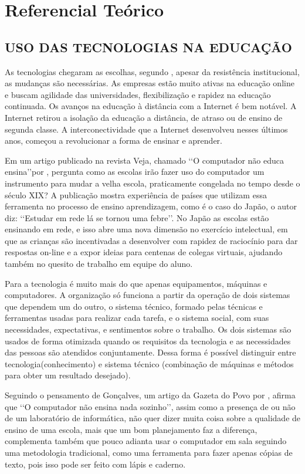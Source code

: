 \chapter[REFERENCIAL TEÓRICO]{Referencial Teórico}

\section{USO DAS TECNOLOGIAS NA EDUCAÇÃO}

As tecnologias chegaram as escolhas, segundo , apesar da resistência institucional, as mudanças são necessárias. As empresas estão muito ativas na educação online e buscam agilidade das universidades, flexibilização e rapidez na educação continuada. Os avanços na educação à distância com a Internet é bem notável. A Internet retirou a isolação da educação a distância, de atraso ou de ensino de segunda classe. A interconectividade que a Internet desenvolveu nesses últimos anos, começou a revolucionar a forma de ensinar e aprender.
\par
Em um artigo publicado na revista Veja, chamado \lq\lq O computador não educa ensina\rq\rq por , pergunta como as escolas irão fazer uso do computador um instrumento para mudar a velha escola, praticamente congelada no tempo desde o século XIX? A publicação mostra experiência de países que utilizam essa ferramenta no processo de ensino aprendizagem, como é o caso do Japão, o autor diz: \lq\lq Estudar em rede lá se tornou uma febre\rq\rq. No Japão as escolas estão ensinando em rede, e isso abre uma nova dimensão no exercício intelectual, em que as crianças são incentivadas a desenvolver com rapidez de raciocínio para dar respostas on-line e a expor ideias para centenas de colegas virtuais, ajudando também no quesito de trabalho em equipe do aluno.
\par
Para   a tecnologia é muito mais do que apenas equipamentos, máquinas e computadores. A organização só funciona a partir da operação de dois sistemas que dependem um do outro, o sistema técnico, formado pelas técnicas e ferramentas usadas para realizar cada tarefa, e o sistema social, com suas necessidades, expectativas, e sentimentos sobre o trabalho. Os dois sistemas são usados de forma otimizada quando os requisitos da tecnologia e as necessidades das pessoas são atendidos conjuntamente. Dessa forma é possível distinguir entre tecnologia(conhecimento) e sistema técnico (combinação de máquinas e métodos para obter um resultado desejado).
\par
Seguindo o pensamento de Gonçalves, um artigo da Gazeta do Povo por , afirma que \lq\lq O computador não ensina nada sozinho\rq\rq, assim como a presença de ou não de um laboratório de informática, não quer dizer muita coisa sobre a qualidade de ensino de uma escola, mais que um bom planejamento faz a diferença, complementa também que pouco adianta usar o computador em sala seguindo uma metodologia tradicional, como uma ferramenta para fazer apenas cópias de texto, pois isso pode ser feito com lápis e caderno.

